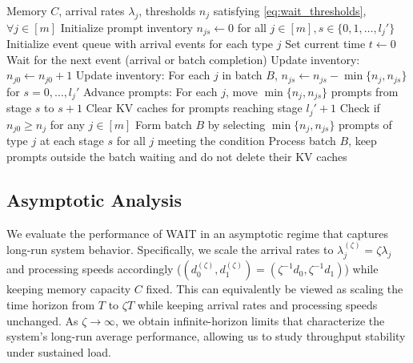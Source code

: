 \begin{algorithm}[h]
\caption{WAIT: Waiting for Accumulated Inference Threshold}
\label{alg:wait}
{\small\linespread{1.0}\selectfont
\begin{algorithmic}[1]
\Require Memory $C$, arrival rates $\lambda_j$, thresholds $n_j$ satisfying \eqref{eq:wait_thresholds}, $\forall j \in [m]$
\State Initialize prompt inventory $n_{js} \gets 0$ for all $j \in [m], s \in \{0, 1, \dots, l_j'\}$
\State Initialize event queue with arrival events for each type $j$
\State Set current time $t \gets 0$
    \State Wait for the next event (arrival or batch completion)
        \State Update inventory: $n_{j0} \gets n_{j0} + 1$  
        \State Update inventory: For each $j$ in batch $B$, $n_{js} \gets n_{js} - \min\{n_j, n_{js}\}$ for $s = 0, \dots, l_j'$
        \State Advance prompts: For each $j$, move $\min\{n_j, n_{js}\}$ prompts from stage $s$ to $s+1$
        \State Clear KV caches for prompts reaching stage $l_j' + 1$  
    \EndIf
    \State Check if $n_{j0} \geq n_j$ for any $j \in [m]$  
        \State Form batch $B$ by selecting $\min\{n_j, n_{js}\}$ prompts of type $j$ at each stage $s$ for all $j$ meeting the condition
        \State Process batch $B$, keep prompts outside the batch waiting and do not delete their KV caches
    \EndIf
\EndWhile
\end{algorithmic}
}
\end{algorithm}

\subsection{Asymptotic Analysis}
\label{subsec:asymptotic_analysis}
We evaluate the performance of WAIT in an asymptotic regime that captures long-run system behavior. Specifically, we scale the arrival rates to $\lambda_j^{(\zeta)} = \zeta \lambda_j$ and processing speeds accordingly ($(d_0^{(\zeta)},d_1^{(\zeta)})=(\zeta^{-1}d_0,\zeta^{-1}d_1)$) while keeping memory capacity $C$ fixed. This can equivalently be viewed as scaling the time horizon from $T$ to $\zeta T$ while keeping arrival rates and processing speeds unchanged. As $\zeta \to \infty$, we obtain infinite-horizon limits that characterize the system's long-run average performance, allowing us to study throughput stability under sustained load.

